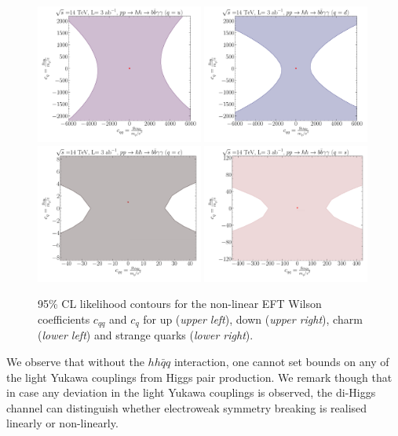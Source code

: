 \begin{figure}[!ht]
	\centering
	\includegraphics[width = 0.49\textwidth]{./fig/up_nleft}
	\includegraphics[width = 0.49\textwidth]{./fig/down_nleft}
	\\
	\includegraphics[width = 0.49\textwidth]{./fig/charm_nleft}
	\includegraphics[width = 0.49\textwidth]{./fig/strange_nleft}
	\caption{95\% CL likelihood contours for the non-linear EFT Wilson coefficients $c_{qq}$ and $ c_{q}$ for up  (\textit{upper left}), down  (\textit{upper right}), charm (\textit{lower left}) and strange quarks (\textit{lower right}).}
	\label{nleft}
\end{figure}
We observe that without the $hh \bar q q$ interaction, one cannot set bounds on any of the light Yukawa couplings from Higgs pair production. We remark though that in case any deviation in the light Yukawa couplings is observed, the di-Higgs channel can distinguish whether electroweak symmetry breaking is realised linearly or non-linearly.
